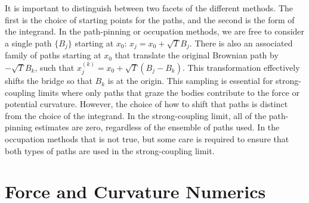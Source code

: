 
It is important to distinguish between two facets of the different methods.
The first is the choice of starting points for the paths, and the second is the form of the integrand.
In the path-pinning or occupation methods, we are free to consider a single path $\{B_j\}$ starting at $x_0$: $x_j=x_0+\sqrt{T}B_j$.
There is also an associated family of paths starting at $x_0$ that translate the original Brownian path
by $-\sqrt{T}B_k$, such that $x^{(k)}_j = x_0+\sqrt{T}(B_j-B_k)$.  This transformation effectively shifts the bridge so that  
$B_k$ is at the origin.  This sampling is essential for strong-coupling limits where only paths that graze 
the bodies contribute to the force or potential curvature.  
However, the choice of how to shift that paths is distinct from the choice of the integrand.
In the strong-coupling limit, all of the path-pinning estimates are zero, regardless of the ensemble of paths used.  
In the occupation methods that is not true, but some care is required to ensure that both types of paths are 
used in the strong-coupling limit.  

\section{Force and Curvature Numerics}

